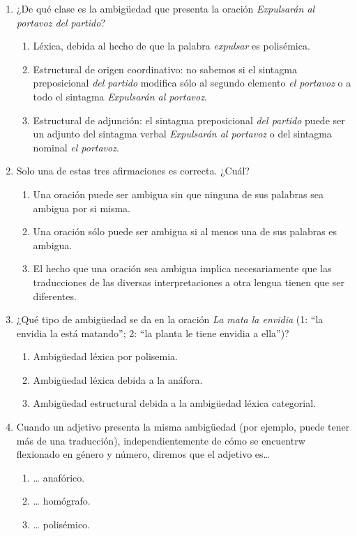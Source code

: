 \begin{enumerate}
\item ¿De qué clase es la ambigüedad que presenta la oración \emph{Expulsarán al portavoz del partido}? \begin{enumerate} \item Léxica, debida al hecho de que la palabra \emph{expulsar} es polisémica. \item Estructural de origen coordinativo: no sabemos si el sintagma preposicional \emph{del partido} modifica sólo al segundo elemento \emph{el portavoz} o a todo el sintagma \emph{Expulsarán al portavoz}. \item Estructural de adjunción: el sintagma preposicional \emph{del partido} puede ser un adjunto del sintagma verbal \emph{Expulsarán al portavoz} o del sintagma nominal \emph{el portavoz}. \end{enumerate} 

\item Solo una de estas tres afirmaciones es correcta. ¿Cuál? \begin{enumerate} \item Una oración puede ser ambigua sin que ninguna de sus palabras sea ambigua por si misma. \item Una oración sólo puede ser ambigua si al menos una de sus palabras es ambigua. \item El hecho que una oración sea ambigua implica necesariamente que las traducciones de las diversas interpretaciones a otra lengua tienen que ser diferentes. \end{enumerate} 

\item ¿Qué tipo de ambigüedad se da en la oración \emph{La mata la envidia} (1: ``la envidia la está matando''; 2: ``la planta le tiene envidia a ella'')? \begin{enumerate} \item Ambigüedad léxica por polisemia. \item Ambigüedad léxica debida a la anáfora. \item Ambigüedad estructural debida a la ambigüedad léxica categorial. \end{enumerate} 

\item Cuando un adjetivo presenta la misma ambigüedad (por ejemplo, puede tener más de una traducción), independientemente de cómo se encuentrw flexionado en género y número, diremos que el adjetivo es{\ldots} \begin{enumerate} \item {\ldots} anafórico. \item {\ldots} homógrafo. \item {\ldots} polisémico. \end{enumerate} 


\end{enumerate}

